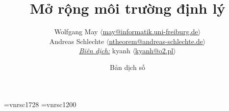 \def\thanks#1{ $\langle$#1$\rangle$}

\font\ftitle=vnrsc1728
\font\fsign=vnrsc1200

\title{%
	\ftitle Mở rộng môi trường định lý%
	\vskip5mm
}
\author{%
	\fsign
	Wolfgang May\thanks{\url{may@informatik.uni-freiburg.de}}
	\\[2mm]
	\fsign Andreas Schlechte\thanks{\url{ntheorem@andreas-schlechte.de}}\\[3mm]
	\emph{\fsign \underline{Biên dịch:}} \fsign kyanh\thanks{\url{kyanh@o2.pl}}%
}
\date{%
	\vskip5mm
	Bản dịch số \textbf{\the\buildnum}\\[2mm]
	}
\maketitle


